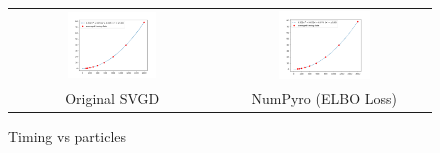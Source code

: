 \begin{figure}[!htbp]
    \centering
    \begin{tabular}{@{}cc@{}}
            \includegraphics[width=0.45\textwidth]{figs/toy-timing-particles.png} & \includegraphics[width=0.45\textwidth]{figs/toy-timing-particles.png}\\
        \small Original SVGD & NumPyro (ELBO Loss) \\
    \end{tabular}
    \caption{Timing vs particles }
    \label{fig:my_label}
\end{figure}
